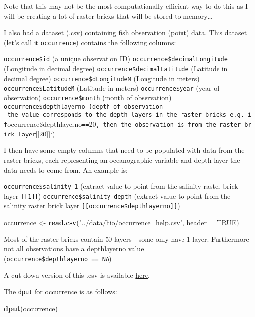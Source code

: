 \documentclass[]{article}
\newenvironment{Shaded}{\begin{snugshade}}{\end{snugshade}}
\newcommand{\KeywordTok}[1]{\textcolor[rgb]{0.13,0.29,0.53}{\textbf{#1}}}
\newcommand{\DataTypeTok}[1]{\textcolor[rgb]{0.13,0.29,0.53}{#1}}
\newcommand{\StringTok}[1]{\textcolor[rgb]{0.31,0.60,0.02}{#1}}
\newcommand{\OtherTok}[1]{\textcolor[rgb]{0.56,0.35,0.01}{#1}}
\newcommand{\NormalTok}[1]{#1}
\begin{document}
Note that this may not be the most computationally efficient way to do
this as I will be creating a lot of raster bricks that will be stored to
memory\ldots{}

I also had a dataset (.csv) containing fish observation (point) data.
This dataset (let's call it \texttt{occurrence}) contains the following
columns:

\texttt{occurrence\$id} (a unique observation ID)
\texttt{occurrence\$decimalLongitude} (Longitude in decimal degree)
\texttt{occurrence\$decimalLatitude} (Latitude in decimal degree)
\texttt{occurrence\$dLongitudeM} (Longitude in meters)
\texttt{occurrence\$LatitudeM} (Latitude in meters)
\texttt{occurrence\$year} (year of observation)
\texttt{occurrence\$month} (month of observation)
\texttt{occurrence\$depthlayerno\ (depth\ of\ observation\ -\ the\ value\ corresponds\ to\ the\ depth\ layers\ in\ the\ raster\ bricks\ e.g.\ if}occurrence\$depthlayerno\texttt{==}20\texttt{,\ then\ the\ observation\ is\ from\ the\ raster\ brick\ layer}{[}{[}20{]}{]}`)

I then have some empty columns that need to be populated with data from
the raster bricks, each representing an oceanographic variable and depth
layer the data needs to come from. An example is:

\texttt{occurrence\$salinity\_1} (extract value to point from the
salinity raster brick layer \texttt{{[}{[}1{]}{]}})
\texttt{occurrence\$salinity\_depth} (extract value to point from the
salinity raster brick layer
\texttt{{[}{[}occurrence\$depthlayerno{]}{]}})

\begin{Shaded}
\begin{Highlighting}[]
\NormalTok{occurrence <-}\StringTok{ }\KeywordTok{read.csv}\NormalTok{(}\StringTok{"../data/bio/occurrence_help.csv"}\NormalTok{, }\DataTypeTok{header =} \OtherTok{TRUE}\NormalTok{)}
\end{Highlighting}
\end{Shaded}

Most of the raster bricks contain 50 layers - some only have 1 layer.
Furthermore not all observations have a depthlayerno value
(\texttt{occurrence\$depthlayerno\ ==\ NA})

A cut-down version of this .csv is available
\href{https://drive.google.com/file/d/13ZTZC48o2i0ZktobfukHjaTMh7Qbrfei/view?usp=sharing}{here}.

The \texttt{dput} for occurrence is as follows:

\begin{Shaded}
\begin{Highlighting}[]
\KeywordTok{dput}\NormalTok{(occurrence)}
\end{Highlighting}
\end{Shaded}
\end{document}
